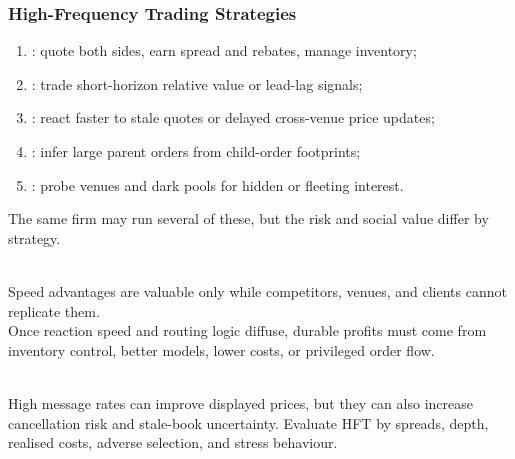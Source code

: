\subsubsection{High-Frequency Trading Strategies}

\begin{taxonomy} 
\begin{enumerate}[label=\roman*.]
\setlength{\itemsep}{0pt}
\item {}: quote both sides, earn spread and rebates, manage inventory;
\item {}: trade short-horizon relative value or lead-lag signals;
\item {}: react faster to stale quotes or delayed cross-venue price updates;
\item {}: infer large parent orders from child-order footprints;
\item {}: probe venues and dark pools for hidden or fleeting interest.
\end{enumerate}
The same firm may run several of these, but the risk and social value differ by strategy.
\end{taxonomy}

\begin{principle} \\
Speed advantages are valuable only while competitors, venues, and clients cannot replicate them.\\
Once reaction speed and routing logic diffuse, durable profits must come from inventory control, better models, lower costs, or privileged order flow.
\end{principle}

\begin{caveat} \\
High message rates can improve displayed prices, but they can also increase cancellation risk and stale-book uncertainty. Evaluate HFT by spreads, depth, realised costs, adverse selection, and stress behaviour.
\end{caveat}
